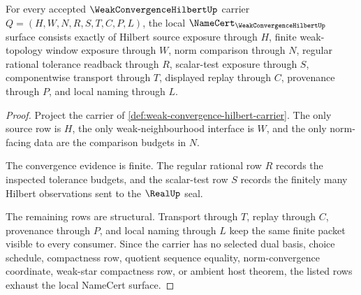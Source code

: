 \begin{theorem}
\label{thm:weak-convergence-hilbert-namecert-obligations}
For every accepted $\WeakConvergenceHilbertUp$ carrier $Q=(H,W,N,R,S,T,C,P,L)$, the local $\NameCert_{\WeakConvergenceHilbertUp}$ surface consists exactly of Hilbert source exposure through $H$, finite weak-topology window exposure through $W$, norm comparison through $N$, regular rational tolerance readback through $R$, scalar-test exposure through $S$, componentwise transport through $T$, displayed replay through $C$, provenance through $P$, and local naming through $L$.
\end{theorem}
\begin{proof}
Project the carrier of \autoref{def:weak-convergence-hilbert-carrier}. The only source row is $H$, the only weak-neighbourhood interface is $W$, and the only norm-facing data are the comparison budgets in $N$.

The convergence evidence is finite. The regular rational row $R$ records the inspected tolerance budgets, and the scalar-test row $S$ records the finitely many Hilbert observations sent to the $\RealUp$ seal.

The remaining rows are structural. Transport through $T$, replay through $C$, provenance through $P$, and local naming through $L$ keep the same finite packet visible to every consumer. Since the carrier has no selected dual basis, choice schedule, compactness row, quotient sequence equality, norm-convergence coordinate, weak-star compactness row, or ambient host theorem, the listed rows exhaust the local NameCert surface.
\end{proof}

